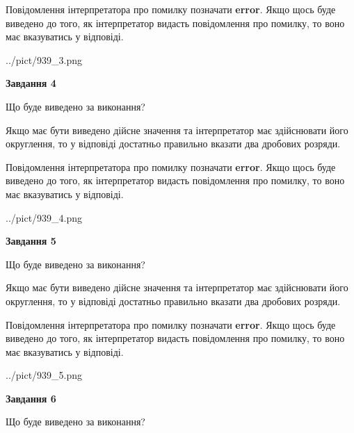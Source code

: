 \documentclass[12pt, ukrainian]{article}
\begin{document}
{\begin {Large}
Повідомлення інтерпретатора про помилку позначати \textbf{error}.
Якщо щось буде виведено до того, як інтерпретатор видасть повідомлення про помилку, 
то воно має вказуватись у відповіді. \par

\begin{center}
	{../pict/939_3.png}
\end{center}
\newpage

{\begin {center}\textbf{Завдання 4}\end {center}}\par
Що буде виведено за виконання? \par

Якщо має бути виведено дійсне значення та інтерпретатор має здійснювати його округлення, 
то у відповіді достатньо правильно вказати два дробових розряди.

Повідомлення інтерпретатора про помилку позначати \textbf{error}.
Якщо щось буде виведено до того, як інтерпретатор видасть повідомлення про помилку, 
то воно має вказуватись у відповіді. \par

\begin{center}
	{../pict/939_4.png}
\end{center}
\newpage

{\begin {center}\textbf{Завдання 5}\end {center}}\par
Що буде виведено за виконання? \par

Якщо має бути виведено дійсне значення та інтерпретатор має здійснювати його округлення, 
то у відповіді достатньо правильно вказати два дробових розряди.

Повідомлення інтерпретатора про помилку позначати \textbf{error}.
Якщо щось буде виведено до того, як інтерпретатор видасть повідомлення про помилку, 
то воно має вказуватись у відповіді. \par

\begin{center}
	{../pict/939_5.png}
\end{center}
\newpage

{\begin {center}\textbf{Завдання 6}\end {center}}\par
Що буде виведено за виконання? \par


\end{Large}}
\end{document}
